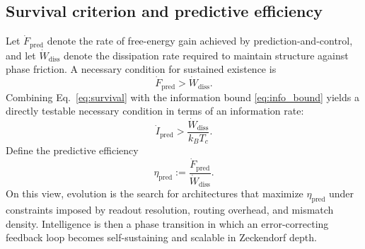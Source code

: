 \subsection{Survival criterion and predictive efficiency}

Let $\dot F_{\mathrm{pred}}$ denote the rate of free-energy gain achieved by prediction-and-control, and let $\dot W_{\mathrm{diss}}$ denote the dissipation rate required to maintain structure against phase friction. A necessary condition for sustained existence is
\begin{equation}
\dot F_{\mathrm{pred}} > \dot W_{\mathrm{diss}}.
\label{eq:survival}
\end{equation}
Combining Eq.~\eqref{eq:survival} with the information bound \eqref{eq:info_bound} yields a directly testable necessary condition in terms of an information rate:
\begin{equation}
  \dot I_{\mathrm{pred}} > \frac{\dot W_{\mathrm{diss}}}{k_B T_c}.
\end{equation}
Define the predictive efficiency
\begin{equation}
\eta_{\mathrm{pred}} := \frac{\dot F_{\mathrm{pred}}}{\dot W_{\mathrm{diss}}}.
\end{equation}
On this view, evolution is the search for architectures that maximize $\eta_{\mathrm{pred}}$ under constraints imposed by readout resolution, routing overhead, and mismatch density. Intelligence is then a phase transition in which an error-correcting feedback loop becomes self-sustaining and scalable in Zeckendorf depth.


